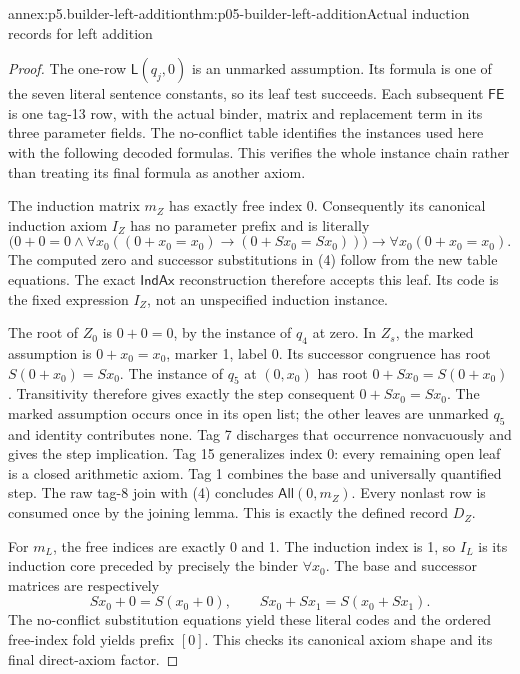\begin{annexitem}{annex:p5.builder-left-addition}{thm:p05-builder-left-addition}{Actual induction records for left addition}
\begin{proof}
The one-row \(\mathsf L(q_j,0)\) is an unmarked assumption. Its formula
is one of the seven literal sentence constants, so its leaf test succeeds.
Each subsequent \(\mathsf{FE}\) is one tag-13 row, with the actual binder,
matrix and replacement term in its three parameter fields. The no-conflict
table identifies the instances used here with the following decoded formulas.
This verifies the whole instance chain rather than treating its final formula
as another axiom.

The induction matrix \(m_Z\) has exactly free index 0. Consequently its
canonical induction axiom \(I_Z\) has no parameter prefix and is literally
\[
 \bigl(0+0=0\land
    \forall x_0((0+x_0=x_0)\to(0+Sx_0=Sx_0))\bigr)
                      \to\forall x_0(0+x_0=x_0).
\tag{4}
\]
The computed zero and successor substitutions in (4) follow from the new
table equations. The exact \(\mathsf{IndAx}\) reconstruction therefore
accepts this leaf. Its code is the fixed expression \(I_Z\), not an
unspecified induction instance.

The root of \(Z_0\) is \(0+0=0\), by the instance of \(q_4\) at
zero. In \(Z_s\), the marked assumption is \(0+x_0=x_0\), marker 1,
label 0. Its successor congruence has root \(S(0+x_0)=Sx_0\). The
instance of \(q_5\) at \((0,x_0)\) has root
\(0+Sx_0=S(0+x_0)\). Transitivity therefore gives exactly the step
consequent \(0+Sx_0=Sx_0\). The marked assumption occurs once in its
open list; the other leaves are unmarked \(q_5\) and identity contributes
none. Tag 7 discharges that occurrence nonvacuously and gives the step
implication. Tag 15 generalizes index 0: every remaining open leaf is a
closed arithmetic axiom. Tag 1 combines the base and universally quantified
step. The raw tag-8 join with (4) concludes \(\mathsf{All}(0,m_Z)\).
Every nonlast row is consumed once by the joining lemma. This is exactly
the defined record \(D_Z\).

For \(m_L\), the free indices are exactly 0 and 1. The induction index
is 1, so \(I_L\) is its induction core preceded by precisely the binder
\(\forall x_0\). The base and successor matrices are respectively
\[
 Sx_0+0=S(x_0+0),\qquad
 Sx_0+Sx_1=S(x_0+Sx_1).
\tag{5}
\]
The no-conflict substitution equations yield these literal codes and the
ordered free-index fold yields prefix \([0]\). This checks its canonical
axiom shape and its final direct-axiom factor.


\end{proof}
\end{annexitem}
